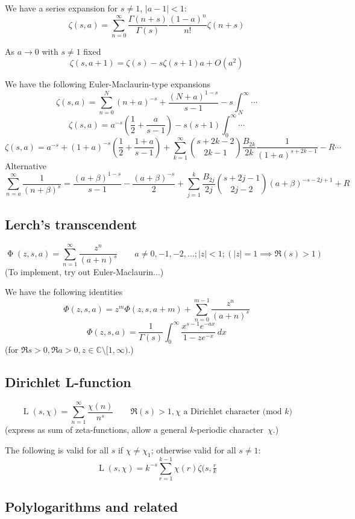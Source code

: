 \documentclass[10pt,dvipdfmx,letterpaper,twoside]{article}
\let\O=\operatorname
\newcommand{\CC}{{\mathbb{C}}}
\let\Gam=\Gamma
\begin{document}
We have a series expansion for $s\neq1$, $|a-1|<1$:
\[ \zeta(s,a) = \sum_{n=0}^\infty \frac{\Gam(n+s)}{\Gam(s)} \frac{(1-a)^n}{n!}\zeta(n+s) \]

As $a\to0$ with $s\neq1$ fixed
\[ \zeta(s,a+1) = \zeta(s) - s \zeta(s+1)a + O(a^2) \]

We have the following Euler-Maclaurin-type expansions
\[ \zeta(s,a) = \sum_{n=0}^N(n+a)^{-s} + \frac{(N+a)^{1-s}}{s-1} - s\int_N^\infty \cdots \]
\[ \zeta(s,a) = a^{-s}(\frac12 + \frac{a}{s-1}) - s(s+1)\int_0^\infty \cdots \]
\[ \zeta(s,a) = a^{-s} + (1+a)^{-s}(\frac12 + \frac{1+a}{s-1}) + \sum_{k=1}^\infty\binom{s+2k-2}{2k-1}\frac{B_{2k}}{2k} \frac{1}{(1+a)^{s+2k-1}} - R\cdots \]
Alternative
\[ \sum_{n=a}^\infty\frac{1}{(n+\beta)^s} = \frac{(a+\beta)^{1-s}}{s-1} - \frac{(a+\beta)^{-s}}{2}
    + \sum_{j=1}^k \frac{B_{2j}}{2j} \binom{s+2j-1}{2j-2} (a+\beta)^{-s-2j+1} + R \]

\subsection{Lerch's transcendent}
\[ \O{\Phi}(z,s,a) = \sum_{n=1}^\infty \frac{z^n}{(a+n)^s} \qquad a\neq0,-1,-2,\dots; |z|<1; (|z|=1 \implies \Re(s)>1) \]
(To implement, try out Euler-Maclaurin...)

We have the following identities
\[ \Phi(z,s,a) = z^m \Phi(z,s,a+m) + \sum_{n=0}^{m-1}\frac{z^n}{(a+n)^s} \]
\[ \Phi(z,s,a) = \frac{1}{\Gam(s)}\int_0^\infty \frac{x^{s-1} e^{-ax}}{1-z e^{-x}}\,dx \]
(for $\Re s>0, \Re a>0, z\in\CC\setminus[1,\infty)$.)

\subsection{Dirichlet L-function}
\[ \O{L}(s,\chi) = \sum_{n=1}^\infty \frac{\chi(n)}{n^s} \qquad \Re(s)>1, \text{$\chi$ a Dirichlet character (mod $k$)} \]
(express as sum of zeta-functions, allow a general $k$-periodic character~$\chi$.)

The following is valid for all $s$ if $\chi\neq\chi_1$; otherwise valid for all $s\neq1$:
\[ \O{L}(s,\chi) = k^{-s}\sum_{r=1}^{k-1}\chi(r)\zeta(s,\tfrac{r}{k} \]

\subsection{Polylogarithms and related}
\end{document}
